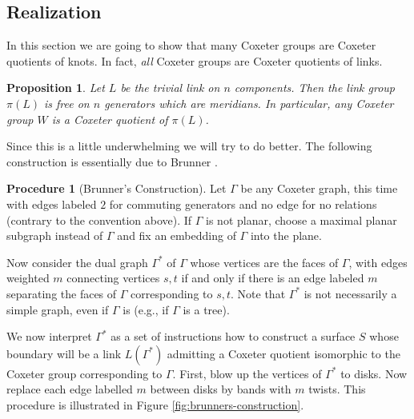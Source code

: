 \documentclass{article}
\newtheorem{corollary}[theorem]{Corollary}
\newtheorem{proposition}[theorem]{Proposition}
\theoremstyle{definition}
\newtheorem{algo}[theorem]{Procedure}
\begin{document}

\subsection{Realization}
In this section we are going to show that many Coxeter groups are Coxeter quotients of knots. In fact, \textit{all} Coxeter groups are Coxeter quotients of links.

\begin{proposition}\label{prop:trivial-realization}
Let $L$ be the trivial link on $n$ components. Then the link group $\pi(L)$ is free on $n$ generators which are meridians. In particular, any Coxeter group $W$ is a Coxeter quotient of $\pi(L)$.
\end{proposition}

Since this is a little underwhelming we will try to do better. The following construction is essentially due to Brunner \cite{brunner1992}.

\begin{algo}[Brunner's Construction]\label{algo:brunner's-construction}
Let $\Gamma$ be any Coxeter graph, this time with edges labeled $2$ for commuting generators and no edge for no relations (contrary to the convention above). If $\Gamma$ is not planar, choose a maximal planar subgraph instead of $\Gamma$ and fix an embedding of $\Gamma$ into the plane.

Now consider the dual graph $\Gamma^*$ of $\Gamma$ whose vertices are the faces of $\Gamma$, with edges weighted $m$ connecting vertices $s, t$ if and only if there is an edge labeled $m$ separating the faces of $\Gamma$ corresponding to $s, t$. Note that $\Gamma^*$ is not necessarily a simple graph, even if $\Gamma$ is (e.g., if $\Gamma$ is a tree).

We now interpret $\Gamma^*$ as a set of instructions how to construct a surface $S$ whose boundary will be a link $L(\Gamma^*)$ admitting a Coxeter quotient isomorphic to the Coxeter group corresponding to $\Gamma$. First, blow up the vertices of $\Gamma^*$ to disks. Now replace each edge labelled $m$ between disks by bands with $m$ twists. This procedure is illustrated in Figure \ref{fig:brunners-construction}.
\end{algo}
\end{document}
